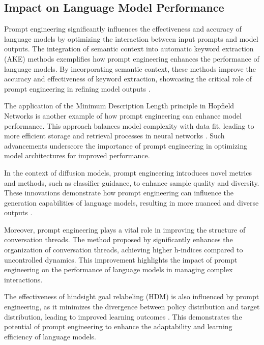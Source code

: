
\subsection{Impact on Language Model Performance} \label{subsec:Impact on Language Model Performance}



Prompt engineering significantly influences the effectiveness and accuracy of language models by optimizing the interaction between input prompts and model outputs. The integration of semantic context into automatic keyword extraction (AKE) methods exemplifies how prompt engineering enhances the performance of language models. By incorporating semantic context, these methods improve the accuracy and effectiveness of keyword extraction, showcasing the critical role of prompt engineering in refining model outputs \cite{altuncu2022improvingperformanceautomatickeyword}.



The application of the Minimum Description Length principle in Hopfield Networks is another example of how prompt engineering can enhance model performance. This approach balances model complexity with data fit, leading to more efficient storage and retrieval processes in neural networks \cite{abudy2023minimumdescriptionlengthhopfield}. Such advancements underscore the importance of prompt engineering in optimizing model architectures for improved performance.



In the context of diffusion models, prompt engineering introduces novel metrics and methods, such as classifier guidance, to enhance sample quality and diversity. These innovations demonstrate how prompt engineering can influence the generation capabilities of language models, resulting in more nuanced and diverse outputs \cite{dhariwal2021diffusion}.



Moreover, prompt engineering plays a vital role in improving the structure of conversation threads. The method proposed by \cite{thalmeier2016actionselectiongrowingstate} significantly enhances the organization of conversation threads, achieving higher h-indices compared to uncontrolled dynamics. This improvement highlights the impact of prompt engineering on the performance of language models in managing complex interactions.



The effectiveness of hindsight goal relabeling (HDM) is also influenced by prompt engineering, as it minimizes the divergence between policy distribution and target distribution, leading to improved learning outcomes \cite{zhang2023understandinghindsightgoalrelabeling}. This demonstrates the potential of prompt engineering to enhance the adaptability and learning efficiency of language models.



